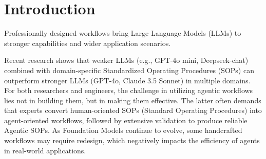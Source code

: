 \section{Introduction}


Professionally designed workflows bring Large Language Models (LLMs) to stronger capabilities and wider application scenarios.







Recent research \cite{li2024debug} shows that weaker LLMs (e.g., GPT-4o mini, Deepseek-chat) combined with domain-specific Standardized Operating Procedures (SOPs) can outperform stronger LLMs (GPT-4o, Claude 3.5 Sonnet) in multiple domains. For both researchers and engineers, the challenge in utilizing agentic workflows lies not in building them, but in making them effective. The latter often demands that experts convert human-oriented SOPs (Standard Operating Procedures) into agent-oriented workflows, followed by extensive validation to produce reliable Agentic SOPs. As Foundation Models continue to evolve, some handcrafted workflows may require redesign, which negatively impacts the efficiency of agents in real-world applications.
 

